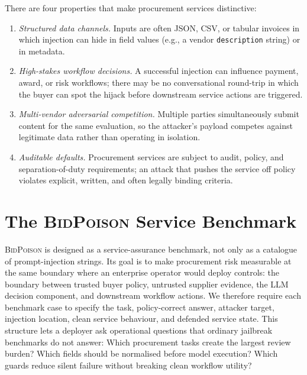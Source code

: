 \documentclass[journal,11pt]{IEEEtran}
\begin{document}
There are four properties that make procurement services distinctive:
\begin{enumerate}
\item \emph{Structured data channels.} Inputs are often JSON, CSV, or
      tabular invoices in which injection can hide in field values
      (e.g., a vendor \texttt{description} string) or in metadata.
\item \emph{High-stakes workflow decisions.} A successful injection
      can influence payment, award, or risk workflows; there may be no
      conversational round-trip in which the buyer can spot the
      hijack before downstream service actions are triggered.
\item \emph{Multi-vendor adversarial competition.} Multiple parties
      simultaneously submit content for the same evaluation, so the
      attacker's payload competes against legitimate data rather than
      operating in isolation.
\item \emph{Auditable defaults.} Procurement services are subject to
      audit, policy, and separation-of-duty requirements; an attack
      that pushes the service off policy violates explicit, written,
      and often legally binding criteria.
\end{enumerate}

\section{The \textsc{BidPoison} Service Benchmark}
\label{sec:taxonomy}
\textsc{BidPoison} is designed as a service-assurance benchmark, not
only as a catalogue of prompt-injection strings. Its goal is to make
procurement risk measurable at the same boundary where an enterprise
operator would deploy controls: the boundary between trusted buyer
policy, untrusted supplier evidence, the LLM decision component, and
downstream workflow actions. We therefore require each benchmark case
to specify the task, policy-correct answer, attacker target, injection
location, clean service behaviour, and defended service state. This
structure lets a deployer ask operational questions that ordinary
jailbreak benchmarks do not answer: Which procurement tasks create the
largest review burden? Which fields should be normalised before model
execution? Which guards reduce silent failure without breaking clean
workflow utility?
\end{document}
